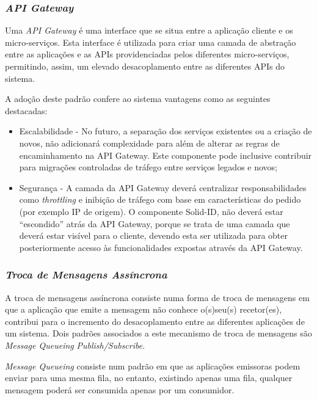 \subsubsection{\emph{API Gateway}} \label{api_gateway}
Uma \emph{API Gateway} é uma interface que se situa entre a aplicação cliente e os micro-serviços. Esta interface é utilizada para criar uma camada de abstração entre as aplicações e as APIs providenciadas pelos diferentes micro-serviços, permitindo, assim, um elevado desacoplamento entre as diferentes APIs do sistema.

A adoção deste padrão confere ao sistema vantagens como as seguintes destacadas:
\begin{itemize}
    \item Escalabilidade - No futuro, a separação dos serviços existentes ou a criação de novos, não adicionará complexidade para além de alterar as regras de encaminhamento na API Gateway. Este componente pode inclusive contribuir para migrações controladas de tráfego entre serviços legados e novos;
    
    \item Segurança - A camada da API Gateway deverá centralizar responsabilidades como \emph{throttling} e inibição de tráfego com base em características do pedido (por exemplo IP de origem). O componente Solid-ID, não deverá estar “escondido” atrás da API Gateway, porque se trata de uma camada que deverá estar visível para o cliente, devendo esta ser utilizada para obter posteriormente acesso às funcionalidades expostas através da API Gateway.
\end{itemize}

\subsubsection{\emph{Troca de Mensagens Assíncrona}} \label{troca_mensagens_assincrona}
A troca de mensagens assíncrona consiste numa forma de troca de mensagens em que a aplicação que emite a mensagem não conhece o(s)seu(s) recetor(es), contribui para o incremento do desacoplamento entre as diferentes aplicações de um sistema.
Dois padrões associados a este mecanismo de troca de mensagens são \emph{Message Queueing} \emph{Publish/Subscribe}.

\emph{Message Queueing} \label{message_queueing} consiste num padrão em que as aplicações emissoras podem enviar para uma mesma fila, no entanto, existindo  apenas uma fila, qualquer mensagem poderá ser consumida apenas por um consumidor.

